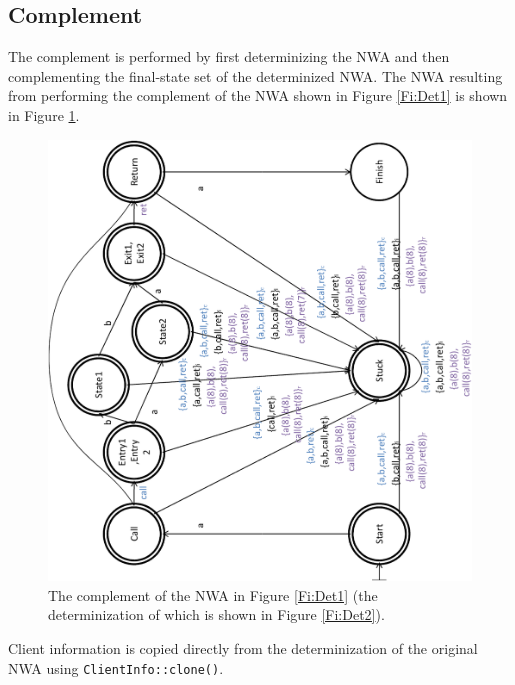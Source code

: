 


\subsection{Complement}
\label{Se:Complement}

The complement is performed by first determinizing the NWA and then
complementing the final-state set of the determinized NWA.  The NWA resulting
from performing the complement of the NWA shown in Figure \ref{Fi:Det1} is
shown in Figure \ref{Fi:Comp1}.

\begin{figure}[p]
  \centering
    \includegraphics[width=12cm]{Figures/Figure20}
  \caption{The complement of the NWA in Figure \ref{Fi:Det1} (the
    determinization of which is shown in Figure \ref{Fi:Det2}).}
  \label{Fi:Comp1}
\end{figure}

Client information is copied directly
from the determinization of the original NWA using \texttt{ClientInfo::clone()}.


